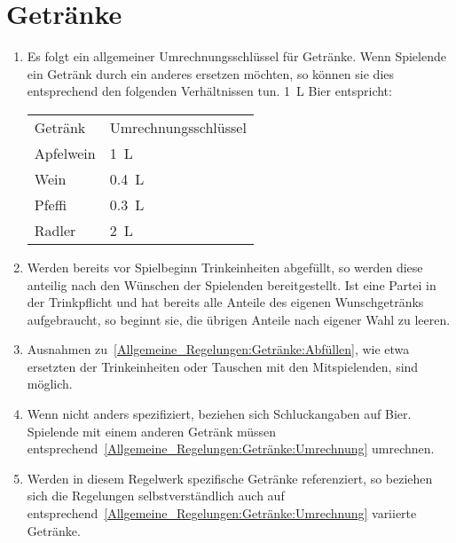 \section{Getränke}\label{Allgemeine_Regelungen:Getränke}
\begin{enumerate}[label={(\arabic*)}]
	\item\label{Allgemeine_Regelungen:Getränke:Umrechnung}
	Es folgt ein allgemeiner Umrechnungsschlüssel für Getränke.
	Wenn Spielende ein Getränk durch ein anderes ersetzen möchten, so können sie dies entsprechend den folgenden Verhältnissen tun.
	\SI{1}{\liter} Bier entspricht:
	\begin{tabular}{ll}
		\toprule
		Getränk   & Umrechnungsschlüssel \\
		Apfelwein & \SI{1}{\liter} \\
		Wein 	  & \SI{0,4}{\liter} \\
		Pfeffi 	  & \SI{0,3}{\liter} \\
		Radler    & \SI{2}{\liter} \\
		\bottomrule
	\end{tabular}
	
	\item\label{Allgemeine_Regelungen:Getränke:Abfüllen}
	Werden bereits vor Spielbeginn Trinkeinheiten abgefüllt, so werden diese anteilig nach den Wünschen der Spielenden bereitgestellt.
	Ist eine Partei in der Trinkpflicht und hat bereits alle Anteile des eigenen Wunschgetränks aufgebraucht, so beginnt sie, die übrigen Anteile nach eigener Wahl zu leeren.
	
	\item
	Ausnahmen zu~\ref{Allgemeine_Regelungen:Getränke:Abfüllen}, wie etwa ersetzten der Trinkeinheiten oder Tauschen mit den Mitspielenden, sind möglich.
	
	\item
	Wenn nicht anders spezifiziert, beziehen sich Schluckangaben auf Bier.
	Spielende mit einem anderen Getränk müssen entsprechend~\ref{Allgemeine_Regelungen:Getränke:Umrechnung} umrechnen.

	\item
	Werden in diesem Regelwerk spezifische Getränke referenziert, so beziehen sich die Regelungen selbstverständlich auch auf entsprechend~\ref{Allgemeine_Regelungen:Getränke:Umrechnung} variierte Getränke.
\end{enumerate}
